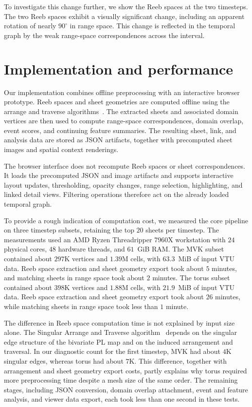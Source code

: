 \documentclass[review]{vgtc}                          %
\begin{document}
To investigate this change further, we show the Reeb spaces at the two timesteps. The two Reeb spaces exhibit a visually significant change, including an apparent rotation of nearly $90^\circ$ in range space. This change is reflected in the temporal graph by the weak range-space correspondences across the interval.

\section{Implementation and performance}
Our implementation combines offline preprocessing with an interactive browser prototype. Reeb spaces and sheet geometries are computed offline using the arrange and traverse algorithms~\cite{hristov2025,Hristov2026SingularAA}. The extracted sheets and associated domain vertices are then used to compute range-space correspondences, domain overlap, event scores, and continuing feature summaries. The resulting sheet, link, and analysis data are stored as JSON artifacts, together with precomputed sheet images and spatial context renderings.

The browser interface does not recompute Reeb spaces or sheet correspondences. It loads the precomputed JSON and image artifacts and supports interactive layout updates, thresholding, opacity changes, range selection, highlighting, and linked detail views. Filtering operations therefore act on the already loaded temporal graph.

To provide a rough indication of computation cost, we measured the core pipeline on three timestep subsets, retaining the top $20$ sheets per timestep. The measurements used an AMD Ryzen Threadripper 7960X workstation with $24$ physical cores, $48$ hardware threads, and $61$~GiB RAM. The MVK subset contained about $297$K vertices and $1.39$M cells, with $63.3$~MiB of input VTU data. Reeb space extraction and sheet geometry export took about $5$ minutes, and matching sheets in range space took about $2$ minutes. The torus subset contained about $398$K vertices and $1.88$M cells, with $21.9$~MiB of input VTU data. Reeb space extraction and sheet geometry export took about $26$ minutes, while matching sheets in range space took less than $1$ minute.

The difference in Reeb space computation time is not explained by input size alone. The Singular Arrange and Traverse algorithm~\cite{Hristov2026SingularAA} depends on the singular edge structure of the bivariate PL map and on the induced arrangement and traversal. In our diagnostic count for the first timestep, MVK had about $4$K singular edges, whereas torus had about $7$K. This difference, together with arrangement and sheet geometry export costs, partly explains why torus required more preprocessing time despite a mesh size of the same order. The remaining stages, including JSON conversion, domain overlap attachment, event and feature analysis, and viewer data export, each took less than one second in these tests.
\end{document}
